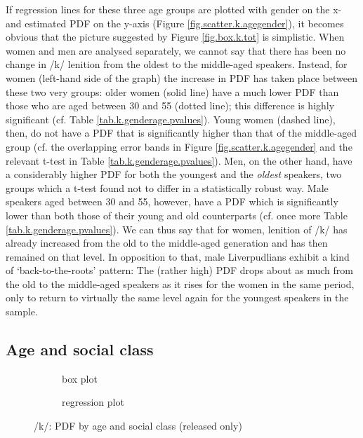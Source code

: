 If regression lines for these three age groups are plotted with gender on the x- and estimated PDF on the y-axis (Figure \ref{fig.scatter.k.agegender}), it becomes obvious that the picture suggested by Figure \ref{fig.box.k.tot} is simplistic.
When women and men are analysed separately, we cannot say that there has been no change in /k/ lenition from the oldest to the middle-aged speakers.
Instead, for women (left-hand side of the graph) the increase in PDF has taken place between these two very groups: older women (solid line) have a much lower PDF than those who are aged between 30 and 55 (dotted line); this difference is highly significant (cf. Table \ref{tab.k.genderage.pvalues}).
Young women (dashed line), then, do not have a PDF that is significantly higher than that of the middle-aged group (cf. the overlapping error bands in Figure \ref{fig.scatter.k.agegender} and the relevant t-test in Table \ref{tab.k.genderage.pvalues}).
Men, on the other hand, have a considerably higher PDF for both the youngest and the \emph{oldest} speakers, two groups which a t-test found not to differ in a statistically robust way.
Male speakers aged between 30 and 55, however, have a PDF which is significantly lower than both those of their young and old counterparts (cf. once more Table \ref{tab.k.genderage.pvalues}).
We can thus say that for women, lenition of /k/ has already increased from the old to the middle-aged generation and has then remained on that level.
In opposition to that, male Liverpudlians exhibit a kind of `back-to-the-roots' pattern: The (rather high) PDF drops about as much from the old to the middle-aged speakers as it rises for the women in the same period, only to return to virtually the same level again for the youngest speakers in the sample.

\subsection{Age and social class}
\label{sec.prod.res.con.k.ageclass}

\begin{figure}[h]
	\centering
	\begin{subfigure}{.49\textwidth}
		\centering
			\resizebox{\linewidth}{!}{} 
		\caption{box plot}
		\label{fig.box.k.ageclass}
	\end{subfigure}
	\begin{subfigure}{.49\textwidth}
		\centering
			\resizebox{\linewidth}{!}{} 
		\caption{regression plot}
		\label{fig.scatter.k.ageclass}
	\end{subfigure}
	\caption{/k/: PDF by age and social class (released only)}
\end{figure}

